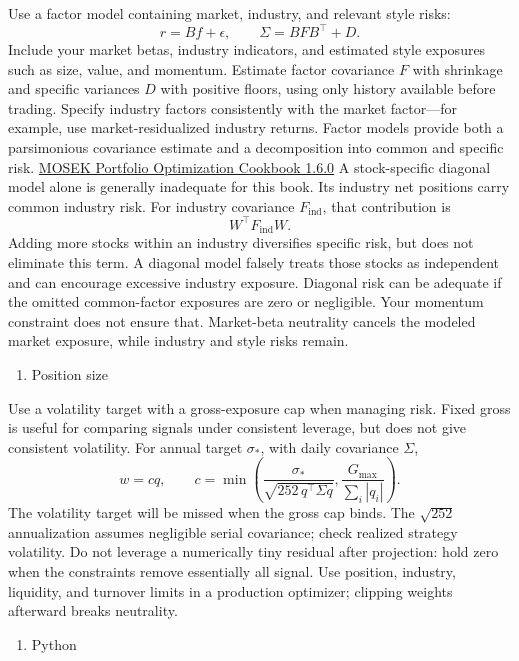 Use a factor model containing market, industry, and relevant style risks:
\[ r=Bf+\epsilon,\qquad \boxed{\Sigma=BFB^\top+D}. \]
Include your market betas, industry indicators, and estimated style exposures such as size, value, and momentum. Estimate factor covariance \(F\) with shrinkage and specific variances \(D\) with positive floors, using only history available before trading. Specify industry factors consistently with the market factor---for example, use market-residualized industry returns. Factor models provide both a parsimonious covariance estimate and a decomposition into common and specific risk. \href{https://docs.mosek.com/portfolio-cookbook/factormodels.html?utm_source=chatgpt.com}{MOSEK Portfolio Optimization Cookbook 1.6.0}
A stock-specific diagonal model alone is generally inadequate for this book. Its industry net positions carry common industry risk. For industry covariance \(F_{\mathrm{ind}}\), that contribution is
\[ W^\top F_{\mathrm{ind}}W. \]
Adding more stocks within an industry diversifies specific risk, but does not eliminate this term. A diagonal model falsely treats those stocks as independent and can encourage excessive industry exposure.
Diagonal risk can be adequate if the omitted common-factor exposures are zero or negligible. Your momentum constraint does not ensure that. Market-beta neutrality cancels the modeled market exposure, while industry and style risks remain.

\begin{enumerate}
\def\labelenumi{\arabic{enumi}.}
\setcounter{enumi}{2}
\tightlist
\item
  Position size
\end{enumerate}

Use a volatility target with a gross-exposure cap when managing risk. Fixed gross is useful for comparing signals under consistent leverage, but does not give consistent volatility.
For annual target \(\sigma_*\), with daily covariance \(\Sigma\),
\[ \boxed{ w=cq,\qquad c=\min\left( \frac{\sigma_*}{\sqrt{252\,q^\top\Sigma q}}, \frac{G_{\max}}{\sum_i|q_i|} \right). } \]
The volatility target will be missed when the gross cap binds. The \(\sqrt{252}\) annualization assumes negligible serial covariance; check realized strategy volatility.
Do not leverage a numerically tiny residual after projection: hold zero when the constraints remove essentially all signal. Use position, industry, liquidity, and turnover limits in a production optimizer; clipping weights afterward breaks neutrality.

\begin{enumerate}
\def\labelenumi{\arabic{enumi}.}
\setcounter{enumi}{3}
\tightlist
\item
  Python
\end{enumerate}

